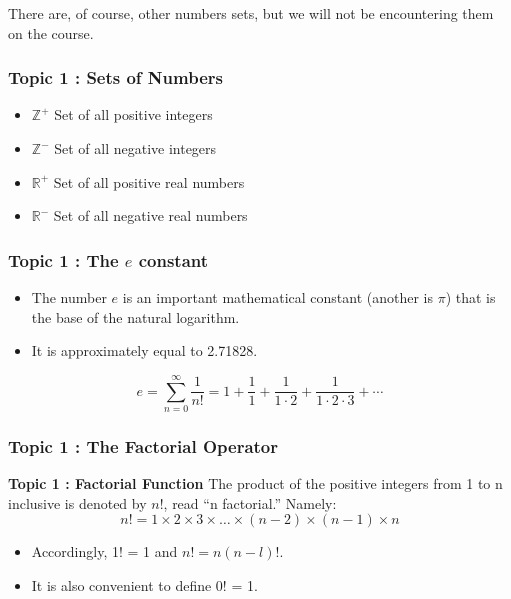 \begin{itemize}
\begin{frame}
	\bigskip There are, of course, other numbers sets, but we will not be encountering them on the course.
\end{frame}

\begin{frame}
	\frametitle{Topic 1 : Sets of Numbers}
	\begin{itemize}
		\item $\mathbb{Z}^{+}$ Set of all positive integers
		\item $\mathbb{Z}^{-}$ Set of all negative integers
		\item $\mathbb{R}^{+}$ Set of all positive real numbers
		\item $\mathbb{R}^{-}$ Set of all negative real numbers
	\end{itemize}
\end{frame}


\begin{frame}
\frametitle{Topic 1 : The $e$ constant}
\begin{itemize}
\item The number $e$ is an important mathematical constant (another is $\pi$) that is the base of the natural logarithm. 
\item It is approximately equal to 2.71828.
\end{itemize}
\[e =  \displaystyle\sum\limits_{n = 0}^{ \infty} \dfrac{1}{n!} = 1 + \frac{1}{1} + \frac{1}{1\cdot 2} + \frac{1}{1\cdot 2\cdot 3} + \cdots  \]
\end{frame}

\begin{frame}
	\frametitle{Topic 1 : The Factorial Operator}
	\textbf{Topic 1 : Factorial Function}
	The product of the positive integers from 1 to n inclusive is denoted by $n!$, read “n factorial.” Namely:
	\[n! = 1 \times 2 \times 3 \times \ldots \times (n−2) \times(n−1)\times n\] 
	\begin{itemize}
		\item Accordingly, 1! = 1 and $n! = n(n − l)!$. 
		
		\item It is also convenient to define 0! = 1.
	\end{itemize}	
\end{frame}


\end{itemize}

